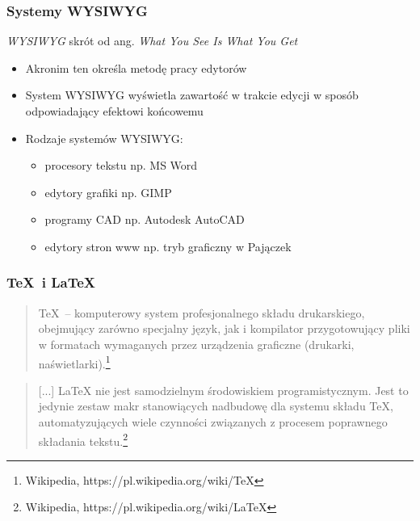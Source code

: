 \documentclass[t]{beamer}
\begin{document}
\begin{frame}
	\frametitle{Systemy WYSIWYG}
	\begin{block}{\emph{WYSIWYG}}
		skrót od ang. \emph{What You See Is What You Get}
	\end{block}
	\begin{itemize}
		\item Akronim ten określa metodę pracy edytorów
		\item System WYSIWYG wyświetla zawartość w trakcie edycji w sposób odpowiadający efektowi końcowemu
		\item Rodzaje systemów WYSIWYG:
			\begin{itemize}
				\item procesory tekstu np. MS Word
				\item edytory grafiki np. GIMP
				\item programy CAD np. Autodesk AutoCAD
				\item edytory stron www np. tryb graficzny w Pajączek
			\end{itemize}
	\end{itemize}
\end{frame}
\begin{frame}
	\frametitle{\TeX\ i \LaTeX\ }
	\begin{quotation}
		\TeX\ – komputerowy system profesjonalnego składu drukarskiego, obejmujący zarówno specjalny język, jak i kompilator przygotowujący pliki w formatach wymaganych przez urządzenia graficzne (drukarki, naświetlarki).\footnote{Wikipedia, https://pl.wikipedia.org/wiki/TeX}
	\end{quotation}
	\begin{quotation}
	[...] LaTeX nie jest samodzielnym środowiskiem programistycznym. Jest to jedynie zestaw makr stanowiących nadbudowę dla systemu składu TeX, automatyzujących wiele czynności związanych z procesem poprawnego składania tekstu.\footnote{Wikipedia, https://pl.wikipedia.org/wiki/LaTeX}
	\end{quotation}
\end{frame}
\end{document}

